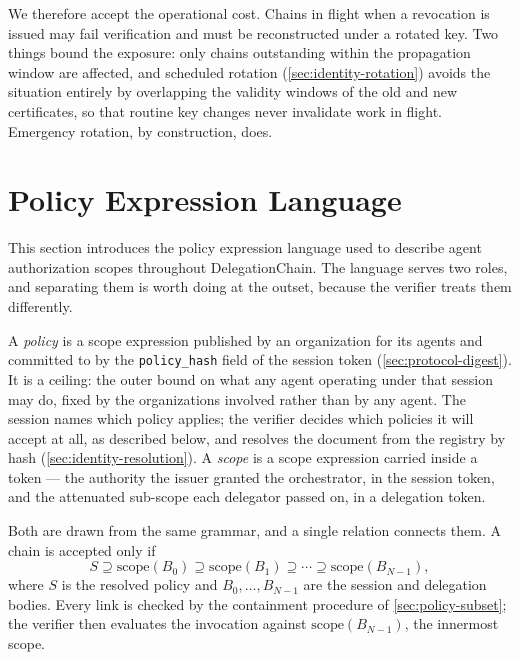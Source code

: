 \documentclass[11pt,a4paper]{article}
\begin{document}
We therefore accept the operational cost. Chains in flight when a
revocation is issued may fail verification and must be reconstructed
under a rotated key. Two things bound the exposure: only chains
outstanding within the propagation window are affected, and scheduled
rotation (\cref{sec:identity-rotation}) avoids the situation entirely by
overlapping the validity windows of the old and new certificates, so
that routine key changes never invalidate work in flight. Emergency
rotation, by construction, does.

\section{Policy Expression Language}
\label{sec:policy}

This section introduces the policy expression language used to describe
agent authorization scopes throughout DelegationChain. The language
serves two roles, and separating them is worth doing at the outset,
because the verifier treats them differently.

A \emph{policy} is a scope expression published by an organization for
its agents and committed to by the \texttt{policy\_hash} field of the
session token (\cref{sec:protocol-digest}). It is a ceiling: the outer
bound on what any agent operating under that session may do, fixed by
the organizations involved rather than by any agent. The session names
which policy applies; the verifier decides which policies it will
accept at all, as described below, and resolves the document from the
registry by hash (\cref{sec:identity-resolution}). A \emph{scope} is a scope expression
carried inside a token --- the authority the issuer granted the
orchestrator, in the session token, and the attenuated sub-scope each
delegator passed on, in a delegation token.

Both are drawn from the same grammar, and a single relation connects
them. A chain is accepted only if
\begin{equation}
\label{eq:chain-containment}
S \supseteq \mathrm{scope}(B_0) \supseteq \mathrm{scope}(B_1)
  \supseteq \cdots \supseteq \mathrm{scope}(B_{N-1}),
\end{equation}
where $S$ is the resolved policy and $B_0, \ldots, B_{N-1}$ are the
session and delegation bodies. Every link is checked by the containment
procedure of \cref{sec:policy-subset}; the verifier then evaluates the
invocation against $\mathrm{scope}(B_{N-1})$, the innermost scope.
\end{document}
